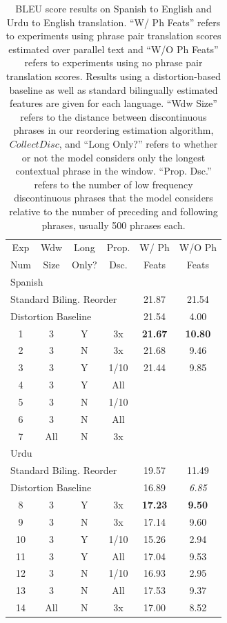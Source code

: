\documentclass[11pt,letterpaper]{article}
\begin{document}
\begin{table}[t]
\begin{small}
\begin{center}
\begin{tabular}{|c|c|c|c|c|c|}
\hline
Exp & Wdw & Long & Prop.  & W/ Ph & W/O Ph \\
Num & Size & Only? &  Dsc. & Feats  & Feats \\
\hline
\multicolumn{6}{|l|}{Spanish} \\
\hline
\multicolumn{4}{|l|}{Standard Biling. Reorder} & 21.87 & 21.54 \\ 
\hline
\multicolumn{4}{|l|}{Distortion Baseline} & 21.54 & 4.00 \\ 
\hline
1 & 3 & Y & 3x & {\bf 21.67} & {\bf 10.80} \\
\hline
2 & 3 & N & 3x & 21.68 & 9.46 \\
3 & 3 & Y & 1/10 & 21.44 & 9.85 \\
4 & 3 & Y & All &  &  \\
5& 3 & N & 1/10 &  &  \\
6& 3 & N & All &  &  \\
7& All & N & 3x &  &  \\
\hline
\hline
\multicolumn{6}{|l|}{Urdu} \\
\hline
\multicolumn{4}{|l|}{Standard Biling. Reorder} & 19.57 & 11.49 \\ 
\hline
\multicolumn{4}{|l|}{Distortion Baseline} & 16.89 & {\it 6.85} \\ %
\hline
8 & 3 & Y & 3x & {\bf 17.23} & {\bf 9.50} \\
\hline
9 & 3 & N & 3x & 17.14 & 9.60 \\
10 & 3 & Y & 1/10 & 15.26 & 2.94 \\
11 & 3 & Y & All & 17.04 & 9.53 \\
12 & 3 & N & 1/10 & 16.93 & 2.95 \\
13 & 3 & N & All & 17.53 & 9.37 \\
14 & All & N & 3x & 17.00 & 8.52 \\
\hline
\end{tabular}
\end{center}
\vskip -0.1in
\caption{\label{bleu-table}BLEU score results on Spanish to English and Urdu to English translation. ``W/ Ph Feats'' refers to experiments using phrase pair translation scores estimated over parallel text and ``W/O Ph Feats'' refers to experiments using no phrase pair translation scores. Results using a distortion-based baseline as well as standard bilingually estimated features are given for each language. ``Wdw Size'' refers to the distance between discontinuous phrases in our reordering estimation algorithm, $CollectDisc$, and ``Long Only?'' refers to whether or not the model considers only the longest contextual phrase in the window. ``Prop. Dsc.'' refers to the number of low frequency discontinuous phrases that the model considers relative to the number of preceding and following phrases, usually 500 phrases each.}
\vskip -0.15in
\end{small}
\end{table}
\end{document}
